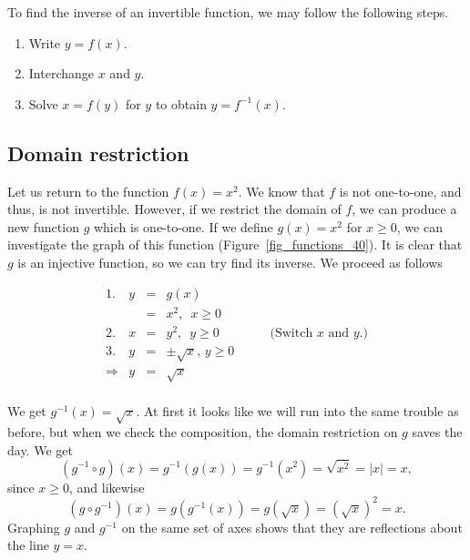 \fi
\fi



To find the inverse of an invertible function, we may follow the following steps. 
\begin{enumerate}

\item  Write $y=f(x)$.

\item Interchange $x$ and $y$.

\item  Solve $x = f(y)$ for $y$ to obtain $y=f^{-1}(x)$.

\end{enumerate}


\subsection{Domain restriction}
Let us return to the function $f(x) = x^2$.  We know that $f$ is not one-to-one, and thus, is not invertible.  However, if we restrict the domain of $f$, we can produce a new function $g$ which is one-to-one.  If we define $g(x) = x^2$ for $x \geq 0$, we can investigate the graph of this function (Figure~\ref{fig_functions_40}). It is clear that $g$ is an injective function, so we can try find its inverse. We proceed as follows

\[ \begin{array}{rrclr}
1.&y & = & g(x) & \\
& & = & x^2, \, \, \, x \geq 0 & \\
2.&x & = & y^2, \, \, \, y \geq 0 & \qquad \mbox{(Switch $x$ and $y$.)}\\
3.&y & = & \pm \sqrt{x},\,y\geq0  & \\
\Rightarrow &y & = & \sqrt{x} &  \\
\end{array} \]

We get $g^{-1}(x) = \sqrt{x}$.  At first it looks like we will run into the same trouble as before, but when we check the composition, the domain restriction on $g$ saves the day.  We get  
$$\left(g^{-1} \circ g\right) (x) = g^{-1}(g(x)) = g^{-1}\left(x^2\right) = \sqrt{x^2} = |x| = x,$$
 since $x \geq 0$, and likewise 
 $$\left( g \circ g^{-1}\right)(x) = g\left(g^{-1}(x)\right) = g\left(\sqrt{x}\right) = \left(\sqrt{x}\right)^2 = x.$$
   Graphing $g$ and $g^{-1}$ on the same set of axes shows that they are reflections about the line $y=x$.


